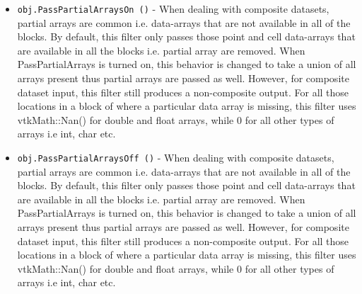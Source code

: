 \begin{itemize}
\item  \verb|obj.PassPartialArraysOn ()| -  When dealing with composite datasets, partial arrays are common i.e.
 data-arrays that are not available in all of the blocks. By default, this
 filter only passes those point and cell data-arrays that are available in
 all the blocks i.e. partial array are removed.  When PassPartialArrays is
 turned on, this behavior is changed to take a union of all arrays present
 thus partial arrays are passed as well. However, for composite dataset
 input, this filter still produces a non-composite output. For all those
 locations in a block of where a particular data array is missing, this
 filter uses vtkMath::Nan() for double and float arrays, while 0 for all
 other types of arrays i.e int, char etc.

\item  \verb|obj.PassPartialArraysOff ()| -  When dealing with composite datasets, partial arrays are common i.e.
 data-arrays that are not available in all of the blocks. By default, this
 filter only passes those point and cell data-arrays that are available in
 all the blocks i.e. partial array are removed.  When PassPartialArrays is
 turned on, this behavior is changed to take a union of all arrays present
 thus partial arrays are passed as well. However, for composite dataset
 input, this filter still produces a non-composite output. For all those
 locations in a block of where a particular data array is missing, this
 filter uses vtkMath::Nan() for double and float arrays, while 0 for all
 other types of arrays i.e int, char etc.

\end{itemize}

